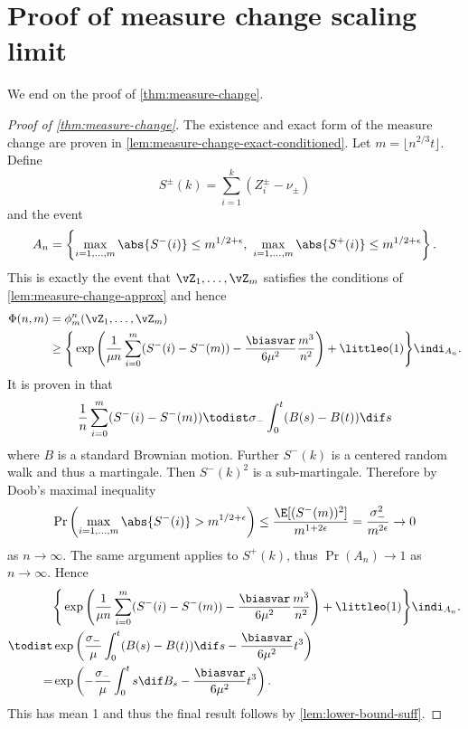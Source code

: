 \section{Proof of measure change scaling limit}

We end on the proof of \cref{thm:measure-change}.

\begin{proof}[Proof of \cref{thm:measure-change}]
    The existence and exact form of the measure change are proven in \cref{lem:measure-change-exact-conditioned}. Let $m = \lfloor n^{2/3} t \rfloor$. Define
    \begin{equation*}
        S^{\pm}(k) = \sum_{i=1}^k (Z^{\pm}_i - \nu_{\pm})
    \end{equation*}
    and the event
    \begin{equation*}
        A_n = \left\{
            \max_{i=1, \ldots, m} \abs{S^-(i)} \leq m^{1/2 + \epsilon}, \ 
            \max_{i=1, \ldots, m} \abs{S^+(i)} \leq m^{1/2 + \epsilon}
        \right\}.
    \end{equation*}
    This is exactly the event that $\vZ_1, \ldots, \vZ_m$ satisfies the conditions of \cref{lem:measure-change-approx} and hence
    \begin{align*}
        \Phi(n, m)
        &= \phi^n_m( \vZ_1, \ldots, \vZ_m) \\
        &\geq \Bigg\{ \exp\left( \frac{1}{\mu n} \sum_{i=0}^m (S^-(i) - S^-(m)) - \frac{\biasvar}{6 \mu^2} \frac{m^3}{n^2} \right) + \littleo(1) \Bigg\} \indi_{A_n}.
    \end{align*}
    It is proven in \cite[Lemma 4.4]{conchon--kerjanStableGraphMetric2020} that
    \begin{equation*}
        \frac{1}{n} \sum_{i=0}^m (S^-(i) - S^-(m)) \todist \sigma_- \int_0^t (B(s) - B(t)) \dif s
    \end{equation*}
    where $B$ is a standard Brownian motion. Further $S^-(k)$ is a centered random walk and thus a martingale. Then $S^-(k)^2$ is a sub-martingale. Therefore by Doob's maximal inequality
    \begin{equation*}
        \Pr\left(
            \max_{i=1, \ldots, m} \abs{S^-(i)} > m^{1/2 + \epsilon}
        \right)
        \leq \frac{\E[(S^-(m))^2]}{m^{1 + 2 \epsilon}} = \frac{\sigma_-^2}{m^{2 \epsilon}} \to 0
    \end{equation*}
    as $n \to \infty$. The same argument applies to $S^+(k)$, thus $\Pr(A_n) \to 1$ as $n \to \infty$. Hence
    \begin{align*}
        &\Bigg\{ \exp\left( \frac{1}{\mu n} \sum_{i=0}^m (S^-(i) - S^-(m)) - \frac{\biasvar}{6 \mu^2} \frac{m^3}{n^2} \right) + \littleo(1) \Bigg\} \indi_{A_n}. \\
        \todist& \exp\left( \frac{\sigma_-}{\mu} \int_0^t (B(s) - B(t)) \dif s  - \frac{\biasvar}{6 \mu^2} t^3 \right) \\ 
        =& \exp\left( - \frac{\sigma_-}{\mu} \int_0^t s \dif B_s  - \frac{\biasvar}{6 \mu^2} t^3 \right).
    \end{align*}
    This has mean 1 and thus the final result follows by \cref{lem:lower-bound-suff}.
\end{proof}